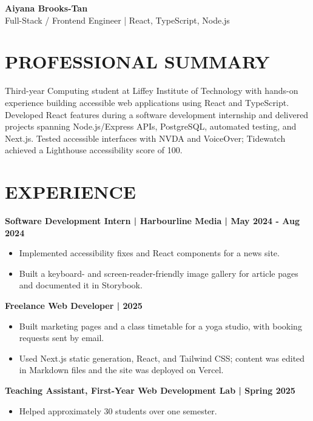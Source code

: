 \documentclass[11pt,a4paper]{article}
\begin{document}
{\begin{center}
{\Huge\bfseries Aiyana Brooks-Tan}\\[0.35em]
{\large Full-Stack / Frontend Engineer | React, TypeScript, Node.js}
\end{center}}

\section*{PROFESSIONAL SUMMARY}
Third-year Computing student at Liffey Institute of Technology with hands-on experience building accessible web applications using React and TypeScript. Developed React features during a software development internship and delivered projects spanning Node.js/Express APIs, PostgreSQL, automated testing, and Next.js. Tested accessible interfaces with NVDA and VoiceOver; Tidewatch achieved a Lighthouse accessibility score of 100.

\section*{EXPERIENCE}
\textbf{Software Development Intern | Harbourline Media | May 2024 - Aug 2024}
\begin{itemize}
\item Implemented accessibility fixes and React components for a news site.
\item Built a keyboard- and screen-reader-friendly image gallery for article pages and documented it in Storybook.
\end{itemize}

\textbf{Freelance Web Developer | 2025}
\begin{itemize}
\item Built marketing pages and a class timetable for a yoga studio, with booking requests sent by email.
\item Used Next.js static generation, React, and Tailwind CSS; content was edited in Markdown files and the site was deployed on Vercel.
\end{itemize}

\textbf{Teaching Assistant, First-Year Web Development Lab | Spring 2025}
\begin{itemize}
\item Helped approximately 30 students over one semester.
\end{itemize}
\end{document}
